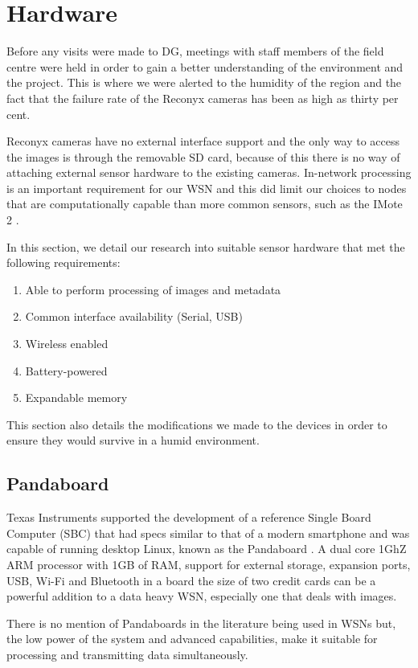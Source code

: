 \section{Hardware}
	Before any visits were made to DG, meetings with staff members of the field centre were held in order to gain a better understanding of the environment and the project. This is where we were alerted to the humidity of the region and the fact that the failure rate of the Reconyx cameras has been as high as thirty per cent.

Reconyx cameras have no external interface support and the only way to access the images is through the removable SD card, because of this there is no way of attaching external sensor hardware to the existing cameras. In-network processing is an important requirement for our WSN and this did limit our choices to nodes that are computationally capable than more common sensors, such as the IMote 2 \cite{Nachman2008}.

In this section, we detail our research into suitable sensor hardware that met the following requirements:
\begin{enumerate}
	\item Able to perform processing of images and metadata
	\item Common interface availability (Serial, USB)
	\item Wireless enabled
	\item Battery-powered
	\item Expandable memory
\end{enumerate}
This section also details the modifications we made to the devices in order to ensure they would survive in a humid environment.

\subsection{Pandaboard}

Texas Instruments supported the development of a reference Single Board Computer (SBC) that had specs similar to that of a modern smartphone and was capable of running desktop Linux, known as the Pandaboard \cite{instruments2012pandaboard}. A dual core 1GhZ ARM processor with 1GB of RAM, support for external storage, expansion ports, USB, Wi-Fi and Bluetooth in a board the size of two credit cards can be a powerful addition to a data heavy WSN, especially one that deals with images.

There is no mention of Pandaboards in the literature being used in WSNs but, the low power of the system and advanced capabilities, make it suitable for processing and transmitting data simultaneously. 
	
